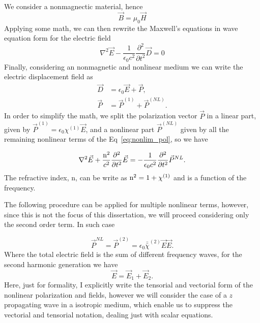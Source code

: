 We consider a nonmagnectic material, hence
\begin{equation}
    \vec{B} = \mu_0 \vec{H}
\end{equation}
%
Applying some math, we can then rewrite the Maxwell's equations in wave equation form for the electric field 
\begin{equation}
    \nabla^2\vec{E} - \frac{1}{\epsilon_0 c^2}\frac{\partial^2}{\partial t^2}\vec{D} = 0
\end{equation}
Finally, considering an nonmagnetic and nonlinear medium we can write the electric displacement field as
\begin{subequations}
    \begin{align}
        \vec{D} &= \epsilon_0\vec{E} +\vec{P},\\
        \vec{P} &= \vec{P}^{(1)} + \vec{P}^{(NL)}.
    \end{align}
\end{subequations}
In order to simplify the math, we split the polarization vector $\vec{P}$ in a linear part, given by $\vec{P}^{(1)} = \epsilon_0\chi^{(1)}\vec{E}$, and a nonlinear part $\vec{P}^{(NL)}$ given by all the remaining nonlinear terms of the Eq~\ref{eq:nonlim_pol}, so we have

\begin{equation}
    \nabla^2\vec{E} +\frac{\text{n}^2}{c^2}\frac{\partial^2}{\partial t^2}\vec{E} = -\frac{1}{\epsilon_0 c^2} \frac{\partial^2}{\partial t^2}\vec{P}^{NL}.
    \label{eq:wave_equation_nonlinear}
\end{equation}
The refractive index, n, can be write as $\text{n}^2= 1 + \chi^{(1)}$ and is a function of the frequency.

The following procedure can be applied for multiple nonlinear terms, however, since this is not the focus of this dissertation, we will proceed considering only the second order term. In such case

\begin{equation}
    \vec{P}^{NL} = \vec{P}^{(2)} = \epsilon_0\bar{\bar{\chi}}^{(2)}\vec{E}\vec{E}.
    \label{eq:nonlinear_polarization}
\end{equation}
Where the total electric field is the sum of different frequency waves, for the second harmonic generation we have
\begin{equation}
    \vec{E} = \vec{E}_1 + \vec{E}_2.
    \label{eq:total_field}
\end{equation}
Here, just for formality, I explicitly write the tensorial and vectorial form of the nonlinear polarization and fields, however we will consider the case of a $z$ propagating wave in a isotropic medium, which enable us to suppress the vectorial and tensorial notation, dealing just with scalar equations.

